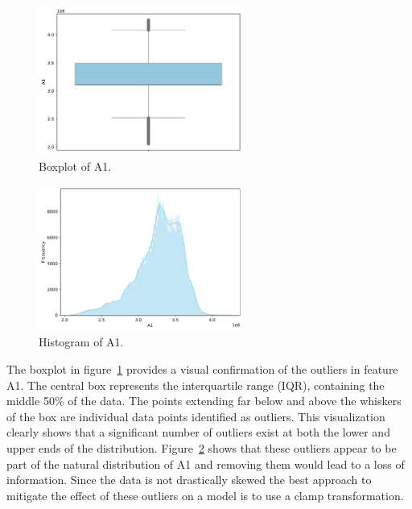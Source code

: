 \documentclass[11pt]{report}
\begin{document}
\begin{figure}[H]
    \centering
    \includegraphics[width=0.6\textwidth]{images/A1_boxplot.pdf}
    \caption{Boxplot of A1.}
    \label{fig:a1_boxplot}
\end{figure}

\begin{figure}[H]
    \centering
    \includegraphics[width=0.6\textwidth]{images/A1_histplot.pdf}
    \caption{Histogram of A1.}
    \label{fig:a1_histplot}
\end{figure}

The boxplot in figure~\ref{fig:a1_boxplot} provides a visual confirmation of the outliers in feature A1. The central box represents the interquartile range (IQR), containing the middle 50\% of the data. The points extending far below and above the whiskers of the box are individual data points identified as outliers. This visualization clearly shows that a significant number of outliers exist at both the lower and upper ends of the distribution. Figure~\ref{fig:a1_histplot} shows that these outliers appear to be part of the natural distribution of A1 and removing them would lead to a loss of information. Since the data is not drastically skewed the best approach to mitigate the effect of these outliers on a model is to use a clamp transformation.
\end{document}
